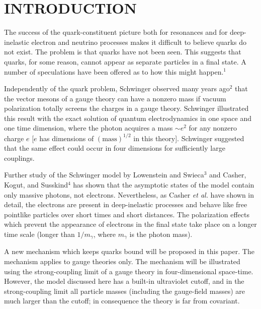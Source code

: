 \section{INTRODUCTION}\label{sec:intro}

The success of the quark-constituent picture both for resonances and for
deep-inelastic electron and neutrino processes makes it difficult to
believe quarks do not exist.  The problem is that quarks have not been
seen.  This suggests that quarks, for some reason, cannot appear as
separate particles in a final state.  A number of speculations have been
offered as to how this might happen.${}^{1}$

Independently of the quark problem, Schwinger observed many years ago${}^{2}$
that the vector mesons of a gauge theory can have a nonzero mass if
vacuum polarization totally screens the charges in a gauge theory.
Schwinger illustrated this result with the exact solution of quantum
electrodynamics in one space and one time dimension, where the photon
acquires a mass $\sim e^{2}$ for any nonzero charge $e$ [$e$ has
dimensions of $(\mathrm{mass})^{1/2}$ in this theory].  Schwinger
suggested that the same effect could occur in four dimensions for
sufficiently large couplings.

Further study of the Schwinger model by Lowenstein and Swieca${}^{3}$
and Casher, Kogut, and Susskind${}^{4}$ has shown that the asymptotic
states of the model contain only massive photons, not electrons.
Nevertheless, as Casher \emph{et al.} have shown in detail, the
electrons are present in deep-inelastic processes and behave like free
pointlike particles over short times and short distances.  The
polarization effects which prevent the appearance of electrons in the
final state take place on a longer time scale (longer than $1/m_{\gamma}$,
where $m_{\gamma}$ is the photon mass).

A new mechanism which keeps quarks bound will be proposed in this paper.
The mechanism applies to gauge theories only.  The mechanism will be
illustrated using the strong-coupling limit of a gauge theory in
four-dimensional space-time.  However, the model discussed here has a
built-in ultraviolet cutoff, and in the strong-coupling limit all
particle masses (including the gauge-field masses) are much larger than
the cutoff; in consequence the theory is far from covariant.

